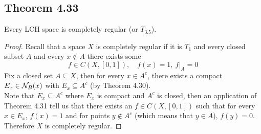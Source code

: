 \documentclass[../../main.tex]{subfiles}
\begin{document}
\subsection{Theorem 4.33}
\begin{wts}
    Every LCH space is completely regular (or $T_{3.5}$).
\end{wts}
\begin{proof}
    Recall that a space $X$ is completely regular if it is $T_1$ and every closed subset $A$ and every $x\notin A$ there exists some 
    \[
    f\in C(X,[0,1]),\quad f(x)=1,\:f|_A = 0
    \]
    Fix a closed set $A\subseteq X$, then for every $x\in A^c$, there exists a compact $E_x\in\mathcal{N}_B({x})$ with $E_x\subseteq A^c$ (by Theorem 4.30).\\ 
    
    Note that $E_x\subseteq A^c$ where $E_x$ is compact and $A^c$ is closed, then an application of Theorem 4.31 tell us that there exists an $f\in C(X,[0,1])$ such that for every $x\in E_x$, $f(x)=1$ and for points $y\notin A^c$ (which means that $y\in A$), $f(y)=0$. Therefore $X$ is completely regular.
\end{proof}
\end{document}
